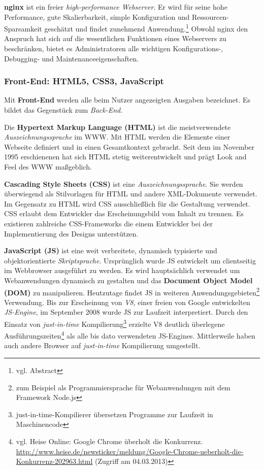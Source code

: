 \documentclass[12pt,a4paper,pointednumbers,abstracton]{scrartcl}
\begin{document}
\textbf{nginx} ist ein freier \emph{high-performance Webserver}.
Er wird für seine hohe Performance, gute Skalierbarkeit, simple Konfiguration und Ressourcen-Sparsamkeit geschätzt und findet zunehmend Anwendung.\footnote{vgl. \cite{Ree08} Abstract}
Obwohl nginx den Anspruch hat sich auf die wesentlichen Funktionen eines Webservers zu beschränken, bietet es Administratoren alle wichtigen Konfigurations-, Debugging- und Maintenanceeigenschaften.

\subsubsection{Front-End: HTML5, CSS3, JavaScript}

Mit \textbf{Front-End} werden alle beim Nutzer angezeigten Ausgaben bezeichnet. Es bildet das Gegenstück zum \emph{Back-End}. 

Die \textbf{Hypertext Markup Language (HTML)} ist die meistverwendete \emph{Auszeichnungssprache} im WWW.
Mit HTML werden die Elemente einer Webseite definiert und in einen Gesamtkontext gebracht.
Seit dem im November 1995 erschienenen \cite{RFC1866} hat sich HTML stetig weiterentwickelt und prägt Look and Feel des WWW maßgeblich.

\textbf{Cascading Style Sheets (CSS)} ist eine \emph{Auszeichnungssprache}.
Sie werden überwiegend als Stilvorlagen für HTML und andere XML-Dokumente verwendet.
Im Gegensatz zu HTML wird CSS ausschließlich für die Gestaltung verwendet.
CSS erlaubt dem Entwickler das Erscheinungsbild vom Inhalt zu trennen.
Es existieren zahlreiche CSS-Frameworks die einem Entwickler bei der Implementierung des Designs unterstützen.

\textbf{JavaScript (JS)} ist eine weit verbreitete, dynamisch typisierte und objektorientierte \emph{Skriptsprache}.
Ursprünglich wurde JS entwickelt um clientseitig im Webbrowser ausgeführt zu werden.
Es wird hauptsächlich verwendet um Webanwendungen dynamisch zu gestalten und das \textbf{Document Object Model (DOM)} zu manipulieren.
Heutzutage findet JS in weiteren Anwendungsgebieten\footnote{zum Beispiel als Programmiersprache für Webanwendungen mit dem Framework Node.js} Verwendung.
Bis zur Erscheinung von \emph{V8}, einer freien von Google entwickelten \emph{JS-Engine}, im September 2008 wurde JS zur Laufzeit interpretiert.
Durch den Einsatz von \emph{just-in-time} Kompilierung\footnote{just-in-time-Kompilierer übersetzen Programme zur Laufzeit in Maschinencode} erzielte V8 deutlich überlegene Ausführungszeiten\footnote{vgl. Heise Online: Google Chrome überholt die Konkurrenz. \url{http://www.heise.de/newsticker/meldung/Google-Chrome-ueberholt-die-Konkurrenz-202963.html} (Zugriff am 04.03.2013)} als alle bis dato verwendeten JS-Engines.
Mittlerweile haben auch andere Browser auf \emph{just-in-time} Kompilierung umgestellt.
\end{document}
